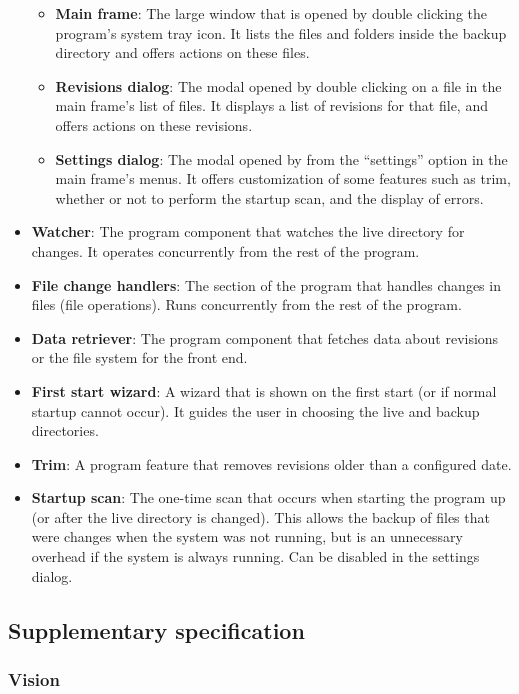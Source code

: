 \documentclass[12pt,a4paper]{article}
\newcommand\todonote[1]{\noindent{\color{red}\fbox{\parbox{\dimexpr\linewidth-2\fboxsep-2\fboxrule}{\textit\large{\textbf{TODO: #1}}}}}}
\begin{document}
\begin{itemize}
\begin{itemize}
	\item \textbf{Main frame}: The large window that is opened by double clicking the program's system tray icon. It lists the files and folders inside the backup directory and offers actions on these files.
	\item \textbf{Revisions dialog}: The modal opened by double clicking on a file in the main frame's list of files. It displays a list of revisions for that file, and offers actions on these revisions.
	\item \textbf{Settings dialog}: The modal opened by from the ``settings'' option in the main frame's menus. It offers customization of some features such as trim, whether or not to perform the startup scan, and the display of errors.
	\end{itemize}
\item \textbf{Watcher}: The program component that watches the live directory for changes. It operates concurrently from the rest of the program.
\item \textbf{File change handlers}: The section of the program that handles changes in files (file operations). Runs concurrently from the rest of the program.
\item \textbf{Data retriever}: The program component that fetches data about revisions or the file system for the front end.
\item \textbf{First start wizard}: A wizard that is shown on the first start (or if normal startup cannot occur). It guides the user in choosing the live and backup directories.
\item \textbf{Trim}: A program feature that removes revisions older than a configured date.
\item \textbf{Startup scan}: The one-time scan that occurs when starting the program up (or after the live directory is changed). This allows the backup of files that were changes when the system was not running, but is an unnecessary overhead if the system is always running. Can be disabled in the settings dialog.
\end{itemize}

\subsection{Supplementary specification}
\subsubsection{Vision}
\todonote{Done by Michael. Adapt from M4.}
\end{document}
